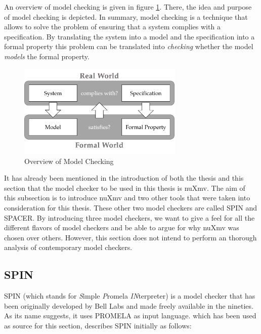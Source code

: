 An overview of model checking is given in figure \ref{fig:model-checking}.
There, the idea and purpose of model checking is depicted.
In summary, model checking is a technique that allows to solve the problem of ensuring that a system complies with a specification.
By translating the system into a model and the specification into a formal property this problem can be translated into \textit{checking} whether the model \textit{models} the formal property.

\begin{figure}
    \centering
    \includegraphics[width=0.7\textwidth]{figures/model-checking.png}
    \caption{Overview of Model Checking}
    \label{fig:model-checking}
\end{figure}

It has already been mentioned in the introduction of both the thesis and this section that the model checker to be used in this thesis is nuXmv.
The aim of this subsection is to introduce nuXmv and two other tools that were taken into consideration for this thesis.
These other two model checkers are called SPIN and SPACER.
By introducing three model checkers, we want to give a feel for all the different flavors of model checkers and be able to argue for why nuXmv was chosen over others.
However, this section does not intend to perform an thorough analysis of contemporary model checkers.

\subsection{SPIN}
\label{sec:spin}

SPIN (which stands for \textit{S}imple \textit{P}romela \textit{IN}terpreter) is a model checker that has been originally developed by Bell Labs and made freely available in the nineties.
As its name suggests, it uses PROMELA as input language.
 \cite{SpinManual} which has been used as source for this section, describes SPIN initially as follows:

